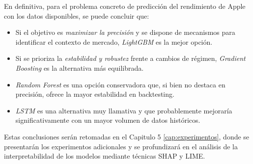 En definitiva, para el problema concreto de predicción del rendimiento de Apple con los datos disponibles, se puede concluir que:

\begin{itemize}
    \item Si el objetivo es \emph{maximizar la precisión} y se dispone de mecanismos para identificar el contexto de mercado, \emph{LightGBM} es la mejor opción.
    \item Si se prioriza la \emph{estabilidad y robustez} frente a cambios de régimen, \emph{Gradient Boosting} es la alternativa más equilibrada.
    \item \emph{Random Forest} es una opción conservadora que, si bien no destaca en precisión, ofrece la mayor estabilidad en backtesting.
    \item \emph{LSTM} es una alternativa muy llamativa y que probablemente mejoraría significativamente con un mayor volumen de datos históricos.
\end{itemize}

Estas conclusiones serán retomadas en el Capitulo 5 \ref{cap:experimentos}, donde se presentarán los experimentos adicionales y se profundizará en el análisis de la interpretabilidad de los modelos mediante técnicas SHAP y LIME.
